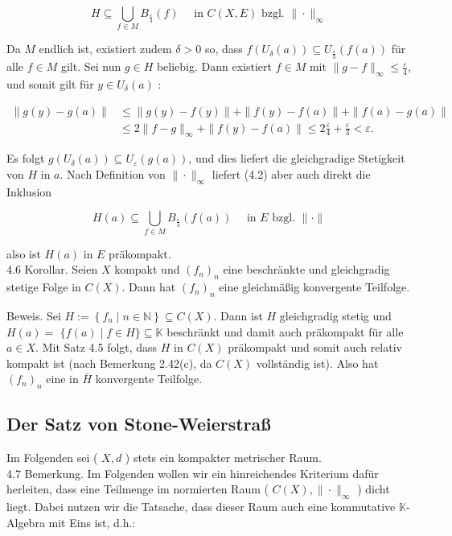 \documentclass[10pt, letterpaper]{article}
\begin{document}
$$
H \subseteq \bigcup_{f \in M} B_{\frac{\varepsilon}{4}}(f) \quad \text { in } C(X, E) \text { bzgl. }\|\cdot\|_{\infty}
$$

Da $M$ endlich ist, existiert zudem $\delta>0$ so, dass $f\left(U_{\delta}(a)\right) \subseteq U_{\frac{\varepsilon}{3}}(f(a))$ für alle $f \in M$ gilt. Sei nun $g \in H$ beliebig. Dann existiert $f \in M$ mit $\|g-f\|_{\infty} \leq \frac{\varepsilon}{4}$, und somit gilt für $y \in U_{\delta}(a)$ :

$$
\begin{aligned}
\|g(y)-g(a)\| & \leq\|g(y)-f(y)\|+\|f(y)-f(a)\|+\|f(a)-g(a)\| \\
& \leq 2\|f-g\|_{\infty}+\|f(y)-f(a)\| \leq 2 \frac{\varepsilon}{4}+\frac{\varepsilon}{3}<\varepsilon .
\end{aligned}
$$

Es folgt $g\left(U_{\delta}(a)\right) \subseteq U_{\varepsilon}(g(a))$, und dies liefert die gleichgradige Stetigkeit von $H$ in $a$. Nach Definition von $\|\cdot\|_{\infty}$ liefert (4.2) aber auch direkt die Inklusion

$$
H(a) \subseteq \bigcup_{f \in M} B_{\frac{\varepsilon}{4}}(f(a)) \quad \text { in } E \text { bzgl. }\|\cdot\|
$$

also ist $H(a)$ in $E$ präkompakt.\\
4.6 Korollar. Seien $X$ kompakt und $\left(f_{n}\right)_{n}$ eine beschränkte und gleichgradig stetige Folge in $C(X)$. Dann hat $\left(f_{n}\right)_{n}$ eine gleichmäßig konvergente Teilfolge.

Beweis. Sei $H:=\left\{f_{n} \mid n \in \mathbb{N}\right\} \subseteq C(X)$. Dann ist $H$ gleichgradig stetig und $H(a)=$ $\{f(a) \mid f \in H\} \subseteq \mathbb{K}$ beschränkt und damit auch präkompakt für alle $a \in X$. Mit Satz 4.5 folgt, dass $H$ in $C(X)$ präkompakt und somit auch relativ kompakt ist (nach Bemerkung 2.42(c), da $C(X)$ vollständig ist). Also hat $\left(f_{n}\right)_{n}$ eine in $\bar{H}$ konvergente Teilfolge.

\subsection*{Der Satz von Stone-Weierstraß}
Im Folgenden sei ( $X, d$ ) stets ein kompakter metrischer Raum.\\
4.7 Bemerkung. Im Folgenden wollen wir ein hinreichendes Kriterium dafür herleiten, dass eine Teilmenge im normierten Raum ( $C(X),\|\cdot\|_{\infty}$ ) dicht liegt. Dabei nutzen wir die Tatsache, dass dieser Raum auch eine kommutative $\mathbb{K}$-Algebra mit Eins ist, d.h.:
\end{document}
